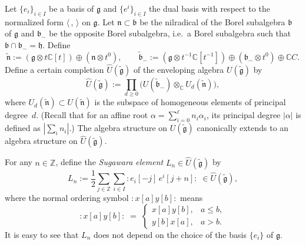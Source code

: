 \documentclass[12pt]{article}
\begin{document}
\begin{definition}\label{def:3.2.1}
Let $\{e_i\}_{i\in I}$ be a basis of $\mathfrak{g}$ and $\{e^i\}_{i\in I}$ the dual basis with respect to the normalized form $\langle\, ,\, \rangle$ on $\mathfrak{g}$.  
Let $\mathfrak{n}\subset\mathfrak{b}$ be the nilradical of the Borel subalgebra $\mathfrak{b}$ of $\mathfrak{g}$ and $\mathfrak{b}_-$ be the opposite Borel subalgebra, i.e.\ a Borel subalgebra such that $\mathfrak{b}\cap\mathfrak{b}_- = \mathfrak{h}$.
Define
\[
\widetilde{\mathfrak{n}} := (\mathfrak{g}\otimes t\mathbb{C}[t]) \oplus (\mathfrak{n}\otimes t^0),
\qquad
\widetilde{\mathfrak{b}}_- := (\mathfrak{g}\otimes t^{-1}\mathbb{C}[t^{-1}]) \oplus (\mathfrak{b}_-\otimes t^0)\oplus \mathbb{C}C.
\tag{1}
\]
Define a certain completion $\widehat{U}(\widetilde{\mathfrak{g}})$ of the enveloping algebra $U(\widetilde{\mathfrak{g}})$ by
\[
\widehat{U}(\widetilde{\mathfrak{g}}) := \prod_{d\ge 0}
\bigl(U(\widetilde{\mathfrak{b}}_-)\otimes_{\mathbb{C}} U_d(\widetilde{\mathfrak{n}})\bigr),
\tag{2}
\]
where $U_d(\widetilde{\mathfrak{n}})\subset U(\widetilde{\mathfrak{n}})$ is the subspace of homogeneous elements of principal degree~$d$.
(Recall that for an affine root $\alpha=\sum_{i=0}^\ell n_i\alpha_i$, its principal degree $|\alpha|$ is defined as $|\sum_i n_i|$.)  
The algebra structure on $U(\widetilde{\mathfrak{g}})$ canonically extends to an algebra structure on $\widehat{U}(\widetilde{\mathfrak{g}})$.

For any $n\in\mathbb{Z}$, define the \emph{Sugawara element} $L_n\in\widehat{U}(\widetilde{\mathfrak{g}})$ by
\[
L_n := \frac{1}{2}\sum_{j\in\mathbb{Z}}\sum_{i\in I}
: e_i[-j]\, e^i[j+n] : \;\in \widehat{U}(\widetilde{\mathfrak{g}}),
\tag{3}
\]
where the normal ordering symbol $:x[a]y[b]:$ means
\[
:x[a]y[b]: \;=\;
\begin{cases}
x[a]y[b], & a\le b,\\[4pt]
y[b]x[a], & a> b.
\end{cases}
\]
It is easy to see that $L_n$ does not depend on the choice of the basis $\{e_i\}$ of $\mathfrak{g}$.
\end{definition}
\end{document}

